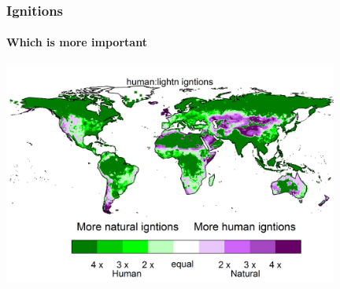 \addtocounter{framenumber}{-1}
\begin{frame}
	\frametitle{Ignitions}
	\framesubtitle{Which is more important}
	
	\includegraphics[width=11.0cm]{images/igntitions/IgntionInfosourceImportance}
\end{frame}


